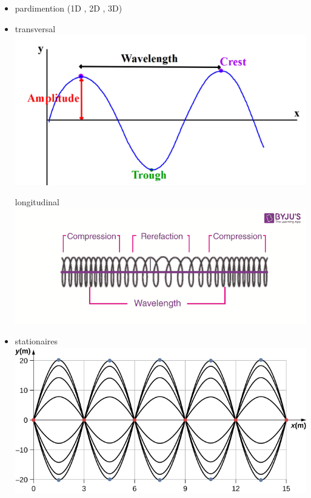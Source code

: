 \documentclass[12pt]{book}
\begin{document}
                \begin{itemize}
                    \item pardimention (1D , 2D , 3D)
                    \item 
                        \begin{minipage}{0.49\linewidth}
                            transversal \\
                            \includegraphics[width =\linewidth]{pic/transversale.png}
                        \end{minipage}
                        \begin{minipage}{0.49\linewidth}
                            longitudinal \\
                            \includegraphics[width =\linewidth]{pic/longitudinal.png}
                        \end{minipage}
                    \item stationaires \\ \includegraphics[width = 0.6\linewidth]{pic/stationair.jpg}
                \end{itemize}
\end{document}
